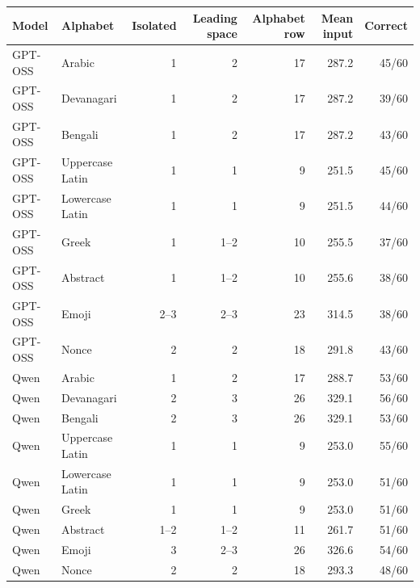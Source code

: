 \begin{tabular}{llrrrrr}
\toprule
Model & Alphabet & Isolated & Leading space & Alphabet row & Mean input & Correct\\
\midrule
GPT-OSS & Arabic & 1 & 2 & 17 & 287.2 & 45/60 \\
GPT-OSS & Devanagari & 1 & 2 & 17 & 287.2 & 39/60 \\
GPT-OSS & Bengali & 1 & 2 & 17 & 287.2 & 43/60 \\
GPT-OSS & Uppercase Latin & 1 & 1 & 9 & 251.5 & 45/60 \\
GPT-OSS & Lowercase Latin & 1 & 1 & 9 & 251.5 & 44/60 \\
GPT-OSS & Greek & 1 & 1--2 & 10 & 255.5 & 37/60 \\
GPT-OSS & Abstract & 1 & 1--2 & 10 & 255.6 & 38/60 \\
GPT-OSS & Emoji & 2--3 & 2--3 & 23 & 314.5 & 38/60 \\
GPT-OSS & Nonce & 2 & 2 & 18 & 291.8 & 43/60 \\
Qwen & Arabic & 1 & 2 & 17 & 288.7 & 53/60 \\
Qwen & Devanagari & 2 & 3 & 26 & 329.1 & 56/60 \\
Qwen & Bengali & 2 & 3 & 26 & 329.1 & 53/60 \\
Qwen & Uppercase Latin & 1 & 1 & 9 & 253.0 & 55/60 \\
Qwen & Lowercase Latin & 1 & 1 & 9 & 253.0 & 51/60 \\
Qwen & Greek & 1 & 1 & 9 & 253.0 & 51/60 \\
Qwen & Abstract & 1--2 & 1--2 & 11 & 261.7 & 51/60 \\
Qwen & Emoji & 3 & 2--3 & 26 & 326.6 & 54/60 \\
Qwen & Nonce & 2 & 2 & 18 & 293.3 & 48/60 \\
\bottomrule
\end{tabular}
